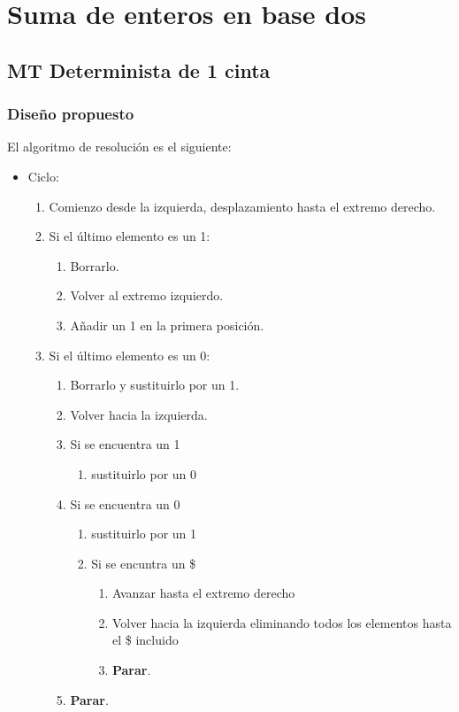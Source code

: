 \section{Suma de enteros en base dos}


\subsection{MT Determinista de 1 cinta}

\subsubsection*{Diseño propuesto}
El algoritmo de resolución es el siguiente:

\begin{itemize}
    \item Ciclo:
    \begin{enumerate}[1.]
        \item Comienzo desde la izquierda, desplazamiento hasta el extremo derecho.
        \item Si el último elemento es un 1:
        \begin{enumerate}[1.]
            \item Borrarlo.
            \item Volver al extremo izquierdo.
            \item Añadir un 1 en la primera posición.
        \end{enumerate}
        \item Si el último elemento es un 0:
        \begin{enumerate}[1.]
            \item Borrarlo y sustituirlo por un 1.
            \item Volver hacia la izquierda.
            \item Si se encuentra un 1 
            \begin{enumerate}[1.] 
                \item sustituirlo por un 0
            \end{enumerate}
            \item Si se encuentra un 0
            \begin{enumerate}[1.]
                \item sustituirlo por un 1
                \item Si se encuntra un \$
                \begin{enumerate}[1.]
                    \item Avanzar hasta el extremo derecho
                    \item Volver hacia la izquierda eliminando todos los elementos hasta el \$ incluido
                    \item \textbf{Parar}.
                \end{enumerate}
            \end{enumerate}
            \item \textbf{Parar}.
        \end{enumerate}
    \end{enumerate}
\end{itemize}

